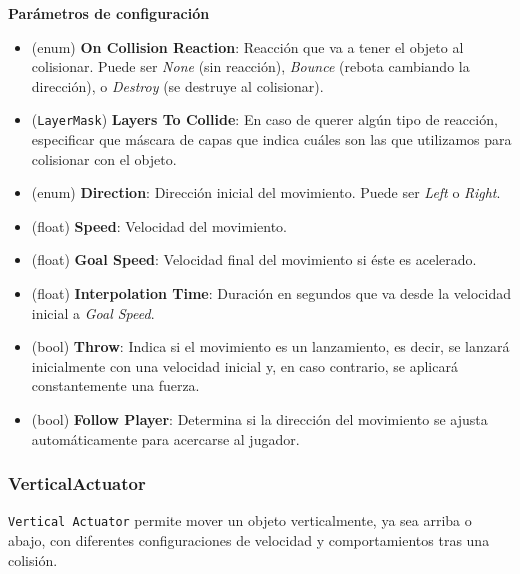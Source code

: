 \textbf{Parámetros de configuración}
\begin{itemize}
	\item (enum) \textbf{On Collision Reaction}: Reacción que va a tener el objeto al colisionar. Puede ser \textit{None} (sin reacción), \textit{Bounce} (rebota cambiando la dirección), o \textit{Destroy} (se destruye al colisionar).
	\item (\texttt{LayerMask}) \textbf{Layers To Collide}: En caso de querer algún tipo de reacción, especificar que máscara de capas que indica cuáles son las que utilizamos para colisionar con el objeto.
	\item (enum) \textbf{Direction}: Dirección inicial del movimiento. Puede ser \textit{Left} o \textit{Right}.
	\item (float) \textbf{Speed}: Velocidad del movimiento.
	\item (float) \textbf{Goal Speed}: Velocidad final del movimiento si éste es acelerado.
	\item (float) \textbf{Interpolation Time}: Duración en segundos que va desde la velocidad inicial a \textit{Goal Speed}.
	\item (bool) \textbf{Throw}: Indica si el movimiento es un lanzamiento, es decir, se lanzará inicialmente con una velocidad inicial y, en caso contrario, se aplicará constantemente una fuerza.
	\item (bool) \textbf{Follow Player}: Determina si la dirección del movimiento se ajusta automáticamente para acercarse al jugador.
\end{itemize}

\subsubsection{VerticalActuator}
\texttt{Vertical Actuator} permite mover un objeto verticalmente, ya sea arriba o abajo, con diferentes configuraciones de velocidad y comportamientos tras una colisión.\\

